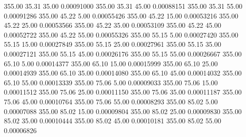     355.00     35.31     35.00     0.00091000
    355.00     35.31     45.00     0.00088151
    355.00     35.31     55.00     0.00091286
    355.00     45.22      5.00     0.00055426
    355.00     45.22     15.00     0.00053216
    355.00     45.22     25.00     0.00053566
    355.00     45.22     35.00     0.00053109
    355.00     45.22     45.00     0.00052722
    355.00     45.22     55.00     0.00055326
    355.00     55.15      5.00     0.00027420
    355.00     55.15     15.00     0.00027849
    355.00     55.15     25.00     0.00027961
    355.00     55.15     35.00     0.00027121
    355.00     55.15     45.00     0.00026176
    355.00     55.15     55.00     0.00026667
    355.00     65.10      5.00     0.00014377
    355.00     65.10     15.00     0.00015999
    355.00     65.10     25.00     0.00014939
    355.00     65.10     35.00     0.00014080
    355.00     65.10     45.00     0.00014032
    355.00     65.10     55.00     0.00013339
    355.00     75.06      5.00     0.00009033
    355.00     75.06     15.00     0.00011512
    355.00     75.06     25.00     0.00011150
    355.00     75.06     35.00     0.00011187
    355.00     75.06     45.00     0.00010764
    355.00     75.06     55.00     0.00008293
    355.00     85.02      5.00     0.00007088
    355.00     85.02     15.00     0.00009804
    355.00     85.02     25.00     0.00009830
    355.00     85.02     35.00     0.00010444
    355.00     85.02     45.00     0.00010181
    355.00     85.02     55.00     0.00006826